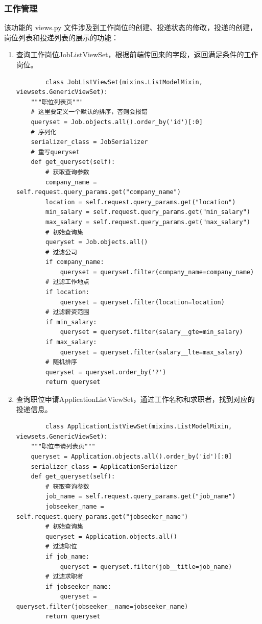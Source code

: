 \documentclass[UTF8,a4paper,10pt]{ctexart}
\begin{document}
\subsubsection{工作管理}
该功能的 views.py 文件涉及到工作岗位的创建、投递状态的修改，投递的创建，岗位列表和投递列表的展示的功能：
\begin{enumerate}
    \item 查询工作岗位JobListViewSet，根据前端传回来的字段，返回满足条件的工作岗位。
    \begin{lstlisting}
        class JobListViewSet(mixins.ListModelMixin, viewsets.GenericViewSet):
    """职位列表页"""
    # 这里要定义一个默认的排序，否则会报错
    queryset = Job.objects.all().order_by('id')[:0]
    # 序列化
    serializer_class = JobSerializer
    # 重写queryset
    def get_queryset(self):
        # 获取查询参数
        company_name = self.request.query_params.get("company_name")
        location = self.request.query_params.get("location")
        min_salary = self.request.query_params.get("min_salary")
        max_salary = self.request.query_params.get("max_salary")
        # 初始查询集
        queryset = Job.objects.all()
        # 过滤公司
        if company_name:
            queryset = queryset.filter(company_name=company_name)
        # 过滤工作地点
        if location:
            queryset = queryset.filter(location=location)
        # 过滤薪资范围
        if min_salary:
            queryset = queryset.filter(salary__gte=min_salary)
        if max_salary:
            queryset = queryset.filter(salary__lte=max_salary)
        # 随机排序
        queryset = queryset.order_by('?')
        return queryset
    \end{lstlisting}
    \item 查询职位申请ApplicationListViewSet，通过工作名称和求职者，找到对应的投递信息。
    \begin{lstlisting}
        class ApplicationListViewSet(mixins.ListModelMixin, viewsets.GenericViewSet):
    """职位申请列表页"""
    queryset = Application.objects.all().order_by('id')[:0]
    serializer_class = ApplicationSerializer
    def get_queryset(self):
        # 获取查询参数
        job_name = self.request.query_params.get("job_name")
        jobseeker_name = self.request.query_params.get("jobseeker_name")
        # 初始查询集
        queryset = Application.objects.all()
        # 过滤职位
        if job_name:
            queryset = queryset.filter(job__title=job_name)
        # 过滤求职者
        if jobseeker_name:
            queryset = queryset.filter(jobseeker__name=jobseeker_name)
        return queryset

\end{lstlisting}
\end{enumerate}
\end{document}

